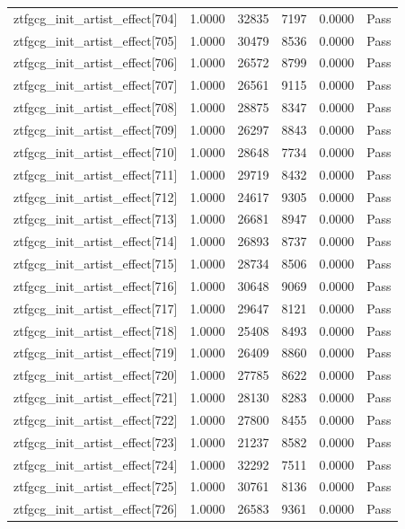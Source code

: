 \begin{table}[htbp]
\begin{tabular}{llrrll}
ztfgcg\_init\_artist\_effect[704] & 1.0000 & 32835 & 7197 & 0.0000 & Pass \\
ztfgcg\_init\_artist\_effect[705] & 1.0000 & 30479 & 8536 & 0.0000 & Pass \\
ztfgcg\_init\_artist\_effect[706] & 1.0000 & 26572 & 8799 & 0.0000 & Pass \\
ztfgcg\_init\_artist\_effect[707] & 1.0000 & 26561 & 9115 & 0.0000 & Pass \\
ztfgcg\_init\_artist\_effect[708] & 1.0000 & 28875 & 8347 & 0.0000 & Pass \\
ztfgcg\_init\_artist\_effect[709] & 1.0000 & 26297 & 8843 & 0.0000 & Pass \\
ztfgcg\_init\_artist\_effect[710] & 1.0000 & 28648 & 7734 & 0.0000 & Pass \\
ztfgcg\_init\_artist\_effect[711] & 1.0000 & 29719 & 8432 & 0.0000 & Pass \\
ztfgcg\_init\_artist\_effect[712] & 1.0000 & 24617 & 9305 & 0.0000 & Pass \\
ztfgcg\_init\_artist\_effect[713] & 1.0000 & 26681 & 8947 & 0.0000 & Pass \\
ztfgcg\_init\_artist\_effect[714] & 1.0000 & 26893 & 8737 & 0.0000 & Pass \\
ztfgcg\_init\_artist\_effect[715] & 1.0000 & 28734 & 8506 & 0.0000 & Pass \\
ztfgcg\_init\_artist\_effect[716] & 1.0000 & 30648 & 9069 & 0.0000 & Pass \\
ztfgcg\_init\_artist\_effect[717] & 1.0000 & 29647 & 8121 & 0.0000 & Pass \\
ztfgcg\_init\_artist\_effect[718] & 1.0000 & 25408 & 8493 & 0.0000 & Pass \\
ztfgcg\_init\_artist\_effect[719] & 1.0000 & 26409 & 8860 & 0.0000 & Pass \\
ztfgcg\_init\_artist\_effect[720] & 1.0000 & 27785 & 8622 & 0.0000 & Pass \\
ztfgcg\_init\_artist\_effect[721] & 1.0000 & 28130 & 8283 & 0.0000 & Pass \\
ztfgcg\_init\_artist\_effect[722] & 1.0000 & 27800 & 8455 & 0.0000 & Pass \\
ztfgcg\_init\_artist\_effect[723] & 1.0000 & 21237 & 8582 & 0.0000 & Pass \\
ztfgcg\_init\_artist\_effect[724] & 1.0000 & 32292 & 7511 & 0.0000 & Pass \\
ztfgcg\_init\_artist\_effect[725] & 1.0000 & 30761 & 8136 & 0.0000 & Pass \\
ztfgcg\_init\_artist\_effect[726] & 1.0000 & 26583 & 9361 & 0.0000 & Pass \\

\end{tabular}
\end{table}
